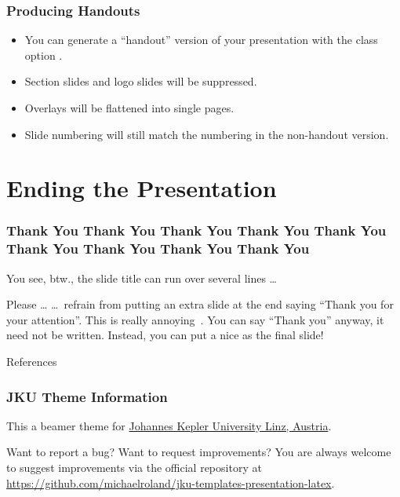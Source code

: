 \documentclass[utf8,aspectratio=169,ngerman,english]{beamer}
\begin{document}
\begin{frame}[label=handout]
\frametitle{Producing Handouts}

\begin{itemize}
\item You can generate a ``handout'' version of your presentation with the class option .
\item Section slides and logo slides will be suppressed.
\item Overlays will be flattened into single pages.
\item Slide numbering will still match the numbering in the non-handout version.
\end{itemize}
\end{frame}


\section{Ending the Presentation}

\begin{frame}
\frametitle{Thank You Thank You Thank You Thank You Thank You Thank You Thank You Thank You Thank You}

You see, btw., the slide title can run over several lines \ldots

\bigskip
\begin{alertblock}{Please \ldots}
\ldots\ refrain from putting an extra slide at the end saying ``\alert{Thank you for your attention}''. This is really annoying~\cite{schultz,karol}. You can say ``Thank you'' anyway, it need not be written. Instead, you can put a nice \textverb{\string\jkulogo} as the final slide!
\end{alertblock}

\end{frame}


\begin{frame}[allowframebreaks]{References}
\printbibliography
\end{frame}


\begin{frame}
\frametitle{JKU Theme Information}

This a beamer theme for \href{https://www.jku.at/}{Johannes Kepler University Linz, Austria}.

\bigskip
\begin{exampleblock}{Want to report a bug? Want to request improvements?}
You are always welcome to suggest improvements via the official repository at \url{https://github.com/michaelroland/jku-templates-presentation-latex}.
\end{exampleblock}
\end{frame}


\jkulogo
\end{document}
